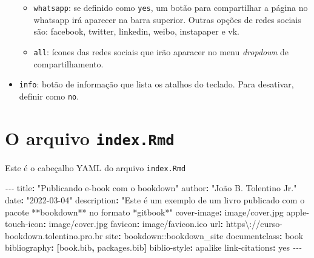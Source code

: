 \documentclass[
]{book}
\newenvironment{Shaded}{\begin{snugshade}}{\end{snugshade}}
\newcommand{\AttributeTok}[1]{\textcolor[rgb]{0.77,0.63,0.00}{#1}}
\newcommand{\CharTok}[1]{\textcolor[rgb]{0.31,0.60,0.02}{#1}}
\newcommand{\FunctionTok}[1]{\textcolor[rgb]{0.00,0.00,0.00}{#1}}
\newcommand{\KeywordTok}[1]{\textcolor[rgb]{0.13,0.29,0.53}{\textbf{#1}}}
\newcommand{\PreprocessorTok}[1]{\textcolor[rgb]{0.56,0.35,0.01}{\textit{#1}}}
\newcommand{\StringTok}[1]{\textcolor[rgb]{0.31,0.60,0.02}{#1}}
\providecommand{\tightlist}{%
  \setlength{\itemsep}{0pt}\setlength{\parskip}{0pt}}
\begin{document}
\begin{itemize}
  \begin{itemize}
  \tightlist
  \item
    \texttt{whatsapp}: se definido como \texttt{yes}, um botão para compartilhar a página no whatsapp irá aparecer na barra superior. Outras opções de redes sociais são: facebook, twitter, linkedin, weibo, instapaper e vk.
  \item
    \texttt{all}: ícones das redes sociais que irão aparacer no menu \emph{dropdown} de compartilhamento.
  \end{itemize}
\item
  \texttt{info}: botão de informação que lista os atalhos do teclado. Para desativar, definir como \texttt{no}.
\end{itemize}

\hypertarget{index0}{%
\chapter{\texorpdfstring{O arquivo \texttt{index.Rmd}}{O arquivo index.Rmd}}\label{index0}}

Este é o cabeçalho YAML do arquivo \texttt{index.Rmd}

\begin{Shaded}
\begin{Highlighting}[]
\PreprocessorTok{{-}{-}{-} }
\FunctionTok{title}\KeywordTok{:}\AttributeTok{ }\StringTok{"Publicando e{-}book com o bookdown"}
\FunctionTok{author}\KeywordTok{:}\AttributeTok{ }\StringTok{"João B. Tolentino Jr."}
\FunctionTok{date}\KeywordTok{:}\AttributeTok{ }\StringTok{"2022{-}03{-}04"}
\FunctionTok{description}\KeywordTok{:}\AttributeTok{ }\StringTok{"Este é um exemplo de um livro publicado com o pacote **bookdown** no formato *gitbook*"}
\FunctionTok{cover{-}image}\KeywordTok{:}\AttributeTok{ image/cover.jpg}
\FunctionTok{apple{-}touch{-}icon}\KeywordTok{:}\AttributeTok{ image/cover.jpg}
\FunctionTok{favicon}\KeywordTok{:}\AttributeTok{ image/favicon.ico}
\FunctionTok{url}\KeywordTok{:}\AttributeTok{ }\StringTok{\textquotesingle{}https\textbackslash{}://curso{-}bookdown.tolentino.pro.br\textquotesingle{}}
\FunctionTok{site}\KeywordTok{:}\AttributeTok{ bookdown::bookdown\_site}
\FunctionTok{documentclass}\KeywordTok{:}\AttributeTok{ book}
\FunctionTok{bibliography}\KeywordTok{:}\AttributeTok{ }\KeywordTok{[}\AttributeTok{book.bib}\KeywordTok{,}\AttributeTok{ packages.bib}\KeywordTok{]}
\FunctionTok{biblio{-}style}\KeywordTok{:}\AttributeTok{ apalike}
\FunctionTok{link{-}citations}\KeywordTok{:}\AttributeTok{ }\CharTok{yes}
\PreprocessorTok{{-}{-}{-}}
\end{Highlighting}
\end{Shaded}
\end{document}
